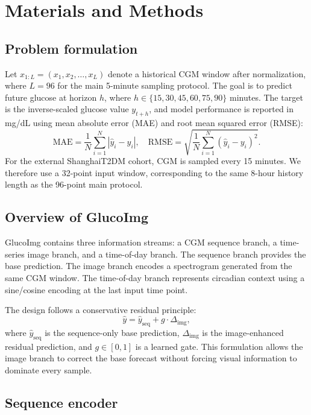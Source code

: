 \documentclass[11pt]{article}
\begin{document}
\section{Materials and Methods}

\subsection{Problem formulation}

Let \(x_{1:L} = (x_1, x_2, \ldots, x_L)\) denote a historical CGM window after normalization, where \(L=96\) for the main 5-minute sampling protocol. The goal is to predict future glucose at horizon \(h\), where \(h \in \{15,30,45,60,75,90\}\) minutes. The target is the inverse-scaled glucose value \(y_{t+h}\), and model performance is reported in mg/dL using mean absolute error (MAE) and root mean squared error (RMSE):
\begin{equation}
\mathrm{MAE} = \frac{1}{N}\sum_{i=1}^{N} |\hat{y}_i-y_i|,
\quad
\mathrm{RMSE} = \sqrt{\frac{1}{N}\sum_{i=1}^{N}(\hat{y}_i-y_i)^2}.
\end{equation}
For the external ShanghaiT2DM cohort, CGM is sampled every 15 minutes. We therefore use a 32-point input window, corresponding to the same 8-hour history length as the 96-point main protocol.

\subsection{Overview of GlucoImg}

GlucoImg contains three information streams: a CGM sequence branch, a time-series image branch, and a time-of-day branch. The sequence branch provides the base prediction. The image branch encodes a spectrogram generated from the same CGM window. The time-of-day branch represents circadian context using a sine/cosine encoding at the last input time point.

The design follows a conservative residual principle:
\begin{equation}
\hat{y} = \hat{y}_{\mathrm{seq}} + g \cdot \Delta_{\mathrm{img}},
\end{equation}
where \(\hat{y}_{\mathrm{seq}}\) is the sequence-only base prediction, \(\Delta_{\mathrm{img}}\) is the image-enhanced residual prediction, and \(g \in [0,1]\) is a learned gate. This formulation allows the image branch to correct the base forecast without forcing visual information to dominate every sample.

\subsection{Sequence encoder}
\end{document}
